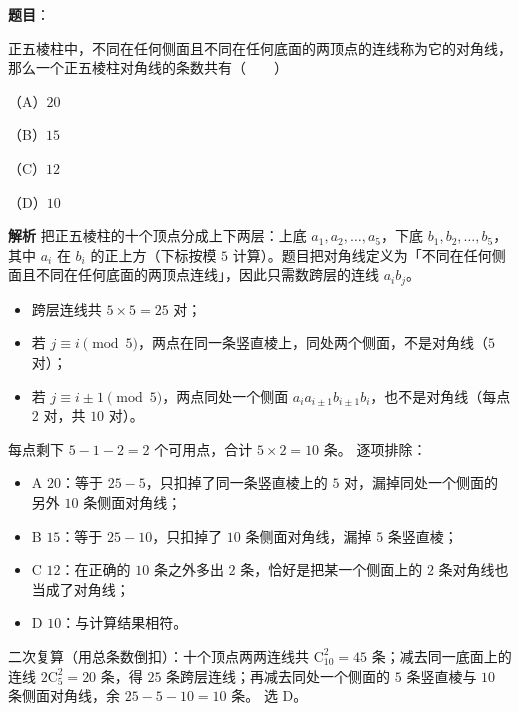 \begin{answer}

\textbf{题目}：

正五棱柱中，不同在任何侧面且不同在任何底面的两顶点的连线称为它的对角线，那么一个正五棱柱对角线的条数共有\mbox{（　　）}

（A）$20$

（B）$15$

（C）$12$

（D）$10$

\textbf{解析}
把正五棱柱的十个顶点分成上下两层：上底 $a_1,a_2,\dots,a_5$，下底 $b_1,b_2,\dots,b_5$，其中 $a_i$ 在 $b_i$ 的正上方（下标按模 $5$ 计算）。题目把对角线定义为「不同在任何侧面且不同在任何底面的两顶点连线」，因此只需数跨层的连线 $a_ib_j$。
\begin{itemize}
\item 跨层连线共 $5\times5=25$ 对；
\item 若 $j\equiv i\pmod5$，两点在同一条竖直棱上，同处两个侧面，不是对角线（$5$ 对）；
\item 若 $j\equiv i\pm1\pmod5$，两点同处一个侧面 $a_ia_{i\pm1}b_{i\pm1}b_i$，也不是对角线（每点 $2$ 对，共 $10$ 对）。
\end{itemize}

每点剩下 $5-1-2=2$ 个可用点，合计 $5\times2=10$ 条。
逐项排除：
\begin{itemize}
\item A $20$：等于 $25-5$，只扣掉了同一条竖直棱上的 $5$ 对，漏掉同处一个侧面的另外 $10$ 条侧面对角线；
\item B $15$：等于 $25-10$，只扣掉了 $10$ 条侧面对角线，漏掉 $5$ 条竖直棱；
\item C $12$：在正确的 $10$ 条之外多出 $2$ 条，恰好是把某一个侧面上的 $2$ 条对角线也当成了对角线；
\item D $10$：与计算结果相符。
\end{itemize}
二次复算（用总条数倒扣）：十个顶点两两连线共 $\mathrm C_{10}^2=45$ 条；减去同一底面上的连线 $2\mathrm C_5^2=20$ 条，得 $25$ 条跨层连线；再减去同处一个侧面的 $5$ 条竖直棱与 $10$ 条侧面对角线，余 $25-5-10=10$ 条。
选 D。


\end{answer}

